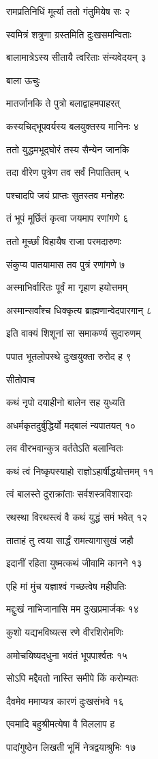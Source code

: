 रामप्रतिनिधिं मूर्त्या ततो गंतुमियेष सः २

स्वमित्रं शत्रुणा ग्रस्तमिति दुःखसमन्विताः

बालामात्रेऽस्य सीतायै त्वरिताः संन्यवेदयन् ३

बाला ऊचुः

मातर्जानकि ते पुत्रो बलाद्वाहमपाहरत्

कस्यचिद्भूपवर्यस्य बलयुक्तस्य मानिनः ४

ततो युद्धमभूद्घोरं तस्य सैन्येन जानकि

तदा वीरेण पुत्रेण तव सर्वं निपातितम् ५

पश्चादपि जयं प्राप्तः सुतस्तव मनोहरः

तं भूपं मूर्छितं कृत्वा जयमाप रणांगणे ६

ततो मूर्च्छां विहायैष राजा परमदारुणः

संकुप्य पातयामास तव पुत्रं रणांगणे ७

अस्माभिर्वारितः पूर्वं मा गृहाण हयोत्तमम्

अस्मान्सर्वांश्च धिक्कृत्य ब्राह्मणान्वेदपारगान् ८

इति वाक्यं शिशूनां सा समाकर्ण्य सुदारुणम्

पपात भूतलोपस्थे दुःखयुक्ता रुरोद ह ९

सीतोवाच

कथं नृपो दयाहीनो बालेन सह युध्यति

अधर्मकृतदुर्बुद्धिर्यो मद्बालं न्यपातयत् १०

लव वीरभवान्कुत्र वर्ततेऽति बलान्वितः

कथं त्वं निष्कृपस्याहो राज्ञोऽहार्षीद्धयोत्तमम् ११

त्वं बालस्ते दुराक्रांताः सर्वशस्त्रविशारदाः

रथस्था विरथस्त्वं वै कथं युद्धं समं भवेत् १२

ताताहं तु त्वया सार्द्धं रामत्यागासुखं जहौ

इदानीं रहिता युष्मत्कथं जीवामि कानने १३

एहि मां मुंच यज्ञाश्वं गच्छत्वेष महीपतिः

मद्दुःखं नाभिजानासि मम दुःखप्रमार्जकः १४

कुशो यद्यभविष्यत्स रणे वीरशिरोमणिः

अमोचयिष्यदधुना भवंतं भूपपार्श्वतः १५

सोऽपि मद्दैवतो नास्ति समीपे किं करोम्यतः

दैवमेव ममाप्यत्र कारणं दुःखसंभवे १६

एवमादि बहुश्रीमत्येषा वै विललाप ह

पादांगुष्ठेन लिखती भूमिं नेत्रद्वयाश्रुभिः १७


